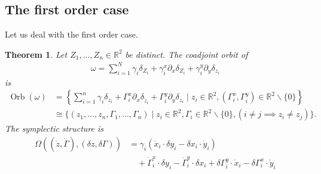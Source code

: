 \documentclass[12pt]{amsart}
\newcommand{\R}{\ensuremath{\mathbb{R}}}
\newtheorem{thm}{Theorem}[section]
\DeclareMathOperator{\Orb}{Orb}
\begin{document}
\subsection{The first order case}
Let us deal with the first order case.
\begin{thm}
Let $Z_1,\dots,Z_n \in \R^2$ be distinct.
The coadjoint orbit of
\begin{align*}
  \omega = \sum_{i=1}^N \gamma_i \delta_{Z_i} + \gamma_i^x \partial_x \delta_{Z_i} + \gamma_i^y \partial_{y} \delta_{z_i}
\end{align*}
is
\begin{align*}
  \Orb(\omega) &= \left\{ \sum_{i=1}^n \gamma_i \delta_{z_i} + \Gamma_i^x \partial_x \delta_{\tilde{z}_i} + \Gamma_i^y \partial_{y} \delta_{z_i}
  \mid z_i \in \R^2, (\Gamma_i^x,\Gamma_i^y) \in \R^2 \backslash \{0\} \right\} \\
  &\cong  \{ (z_1,\dots,z_n,\Gamma_1,\dots,\Gamma_n) \mid z_i \in \R^2, \Gamma_i \in \R^2 \backslash \{0\} , ( i \neq j \implies z_i \neq z_j ) \}.
\end{align*}
The symplectic structure is
  \begin{align*}
    \Omega( (\dot{z},\dot{\Gamma}), (\delta z,\delta \Gamma) ) &=
    \gamma_i ( \dot{x}_i \cdot \delta y_i - \delta x_i \cdot \dot{y}_i ) \\
    &\quad + \dot{\Gamma}_i^x \cdot \delta y_i
    - \dot{\Gamma}_i^y \cdot \delta x_i
    + \delta \Gamma_i^y \cdot \dot{x}_i 
    - \delta \Gamma_i^x \cdot \dot{y}_i
  \end{align*}
\end{thm}
\end{document}
